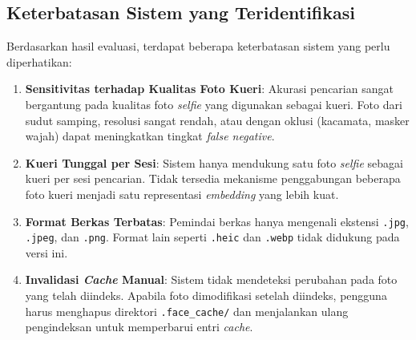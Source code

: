 \subsection{Keterbatasan Sistem yang Teridentifikasi}

Berdasarkan hasil evaluasi, terdapat beberapa keterbatasan sistem yang perlu diperhatikan:

\begin{enumerate}
    \item \textbf{Sensitivitas terhadap Kualitas Foto Kueri}: Akurasi pencarian sangat bergantung pada kualitas foto \textit{selfie} yang digunakan sebagai kueri. Foto dari sudut samping, resolusi sangat rendah, atau dengan oklusi (kacamata, masker wajah) dapat meningkatkan tingkat \textit{false negative}.

    \item \textbf{Kueri Tunggal per Sesi}: Sistem hanya mendukung satu foto \textit{selfie} sebagai kueri per sesi pencarian. Tidak tersedia mekanisme penggabungan beberapa foto kueri menjadi satu representasi \textit{embedding} yang lebih kuat.

    \item \textbf{Format Berkas Terbatas}: Pemindai berkas hanya mengenali ekstensi \texttt{.jpg}, \texttt{.jpeg}, dan \texttt{.png}. Format lain seperti \texttt{.heic} dan \texttt{.webp} tidak didukung pada versi ini.

    \item \textbf{Invalidasi \textit{Cache} Manual}: Sistem tidak mendeteksi perubahan pada foto yang telah diindeks. Apabila foto dimodifikasi setelah diindeks, pengguna harus menghapus direktori \texttt{.face\_cache/} dan menjalankan ulang pengindeksan untuk memperbarui entri \textit{cache}.
\end{enumerate}
